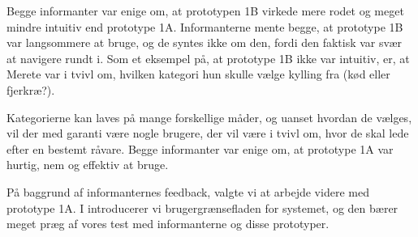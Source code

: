 Begge informanter var enige om, at prototypen 1B virkede mere rodet og meget mindre intuitiv end prototype 1A. Informanterne mente begge, at prototype 1B var langsommere at bruge, og de syntes ikke om den, fordi den faktisk var svær at navigere rundt i. Som et eksempel på, at prototype 1B ikke var intuitiv, er, at Merete var i tvivl om, hvilken kategori hun skulle vælge \fx kylling fra (kød eller fjerkræ?). 

Kategorierne kan laves på mange forskellige måder, og uanset hvordan de vælges, vil der med garanti være nogle brugere, der vil være i tvivl om, hvor de skal lede efter en bestemt råvare. Begge informanter var enige om, at prototype 1A var hurtig, nem og effektiv at bruge.

På baggrund af informanternes feedback, valgte vi at arbejde videre med prototype 1A. I  introducerer vi brugergrænsefladen for systemet, og den bærer meget præg af vores test med informanterne og disse prototyper.